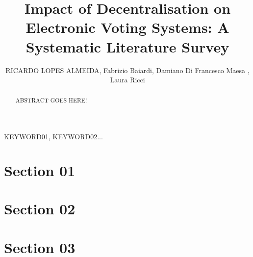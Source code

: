 \documentclass{ieeeaccess}
\begin{document}
\doi{}

\title{Impact of Decentralisation on Electronic Voting Systems: A Systematic Literature Survey}
\author{\uppercase{Ricardo Lopes Almeida},
    Fabrizio Baiardi,
    Damiano Di Francesco Maesa ,
    Laura Ricci
}

\address[1]{Universit\'a di Camerino, 62032 MC, Camerino, Italy (e-mail: ricardo.almeida@unicam.it)}
\address[2]{Dipartimento di Informatica, Universit\'a di Pisa, 56127 PI, Pisa, Italy}





\begin{abstract}
    ABSTRACT GOES HERE!
\end{abstract}

\begin{keywords}
    KEYWORD01, KEYWORD02...
\end{keywords}

\titlepgskip=-21pt

\maketitle

\section{Section 01}
\label{sec:section01}



\section{Section 02}
\label{sec:section02}



\section{Section 03}
\label{sec:section03}

\end{document}
